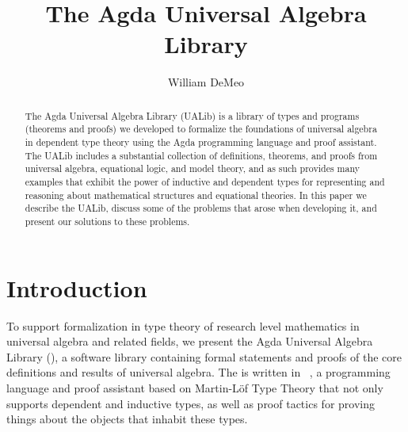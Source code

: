 \documentclass[a4paper,UKenglish,cleveref,autoref,thm-restate]{lipics-v2021}
\title{The Agda Universal Algebra Library}
\author{William DeMeo}
       {Department of Algebra, Charles University in Prague \and \url{https://williamdemeo.gitlab.io}}
       {williamdemeo@gmail.com}
       {https://orcid.org/0000-0003-1832-5690}
       {}
\begin{document}
\maketitle


\begin{abstract}
The Agda Universal Algebra Library (UALib) is a library of types and programs (theorems and proofs) we developed to formalize the foundations of universal algebra in dependent type theory using the Agda programming language and proof assistant. 
 The UALib includes a substantial collection of definitions, theorems, and proofs from universal algebra, equational logic, and model theory, and as such provides many examples that exhibit the power of inductive and dependent types for representing and reasoning about mathematical structures and equational theories. In this paper we describe the UALib, discuss some of the problems that arose when developing it, and present our solutions to these problems.
\end{abstract}

\section{Introduction}\label{sec:introduction}
To support formalization in type theory of research level mathematics in universal algebra and related fields, we present the Agda Universal Algebra Library (\agdaualib), a software library containing formal statements and proofs of the core definitions and results of universal algebra. 
The \ualib is written in \agda~\cite{Norell:2009}, a programming language and proof assistant based on Martin-L\"of Type Theory that not only supports dependent and inductive types, as well as proof tactics for proving things about the objects that inhabit these types.
\end{document}

